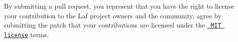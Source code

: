 By submitting a pull request, you represent that you have the right to license your contribution to the Laf project owners and the community, agree by submitting the patch that your contributions are licensed under the \href{https://raw.githubusercontent.com/aseprite/laf/main/LICENSE.txt}{\texttt{ MIT license}} terms. 